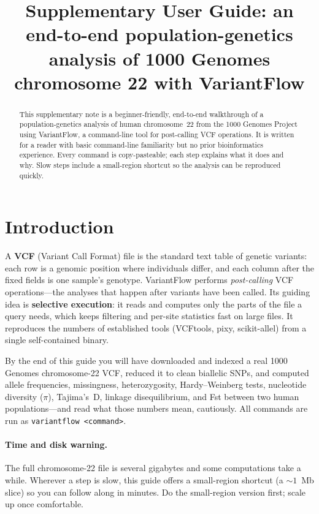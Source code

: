 \documentclass[11pt]{article}
\title{Supplementary User Guide: an end-to-end population-genetics analysis of
1000 Genomes chromosome 22 with VariantFlow}
\author{}
\date{}
\begin{document}
\maketitle

\begin{abstract}
\noindent This supplementary note is a beginner-friendly, end-to-end walkthrough
of a population-genetics analysis of human chromosome~22 from the 1000 Genomes
Project using \textsf{VariantFlow}, a command-line tool for post-calling VCF
operations. It is written for a reader with basic command-line familiarity but no
prior bioinformatics experience. Every command is copy-pasteable; each step
explains what it does and why. Slow steps include a small-region shortcut so the
analysis can be reproduced quickly.
\end{abstract}

\section{Introduction}
A \textbf{VCF} (Variant Call Format) file is the standard text table of genetic
variants: each row is a genomic position where individuals differ, and each column
after the fixed fields is one sample's genotype. \textsf{VariantFlow} performs
\emph{post-calling} VCF operations---the analyses that happen after variants have
been called. Its guiding idea is \textbf{selective execution}: it reads and
computes only the parts of the file a query needs, which keeps filtering and
per-site statistics fast on large files. It reproduces the numbers of established
tools (VCFtools, pixy, scikit-allel) from a single self-contained binary.

By the end of this guide you will have downloaded and indexed a real 1000 Genomes
chromosome-22 VCF, reduced it to clean biallelic SNPs, and computed allele
frequencies, missingness, heterozygosity, Hardy--Weinberg tests, nucleotide
diversity ($\pi$), Tajima's~D, linkage disequilibrium, and Fst between two human
populations---and read what those numbers mean, cautiously. All commands are run
as \texttt{variantflow <command>}.

\paragraph{Time and disk warning.} The full chromosome-22 file is several
gigabytes and some computations take a while. Wherever a step is slow, this guide
offers a small-region shortcut (a ${\sim}1$~Mb slice) so you can follow along in
minutes. Do the small-region version first; scale up once comfortable.
\end{document}

